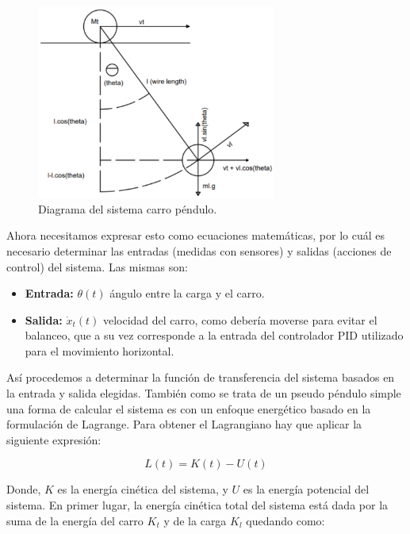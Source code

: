 \documentclass[11pt]{article}
\begin{document}
\begin{figure}[h!]
	\centering
	\includegraphics[width=0.7\textwidth]{images/imagen_14_sistema_carro_pendulo.png}
	\caption{Diagrama del sistema carro péndulo.}
	\label{fig:sistema_carro_pendulo}
\end{figure}

Ahora necesitamos expresar esto como ecuaciones matemáticas, por lo cuál es necesario determinar las entradas (medidas con sensores) y salidas (acciones de control) del sistema. Las mismas son:

\begin{itemize}
	\item \textbf{Entrada:} $\theta (t)$ ángulo entre la carga y el carro.
	\item \textbf{Salida:} $\dot{x}_{t}(t)$ velocidad del carro, como debería moverse para evitar el balanceo, que a su vez corresponde a la entrada del controlador PID utilizado para el movimiento horizontal.
\end{itemize}

Así procedemos a determinar la función de transferencia del sistema basados en la entrada y salida elegidas. También como se trata de un pseudo péndulo simple una forma de calcular el sistema es con un enfoque energético basado en la formulación de Lagrange. Para obtener el Lagrangiano hay que aplicar la siguiente expresión:

\begin{equation}
	\label{eq:lagrangiano}
	L(t)=K(t)-U(t)
\end{equation}

Donde, $K$ es la energía cinética del sistema, y $U$ es la energía potencial del sistema. En primer lugar, la energía cinética total del sistema está dada por la suma de la energía del carro $K_{t}$ y de la carga $K_{l}$ quedando como:
\end{document}
